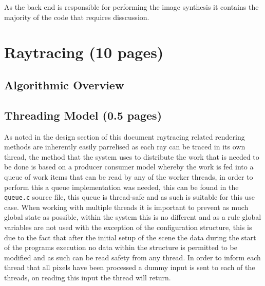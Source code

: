 As the back end is responsible for performing the image synthesis it contains the majority of the code that requires disscussion.



\section{Raytracing (10 pages)}
%
%
%
%

\subsection{Algorithmic Overview}

\subsection{Threading Model (0.5 pages)}
As noted in the design section of this document raytracing related rendering methods are inherently easily parrelised as each
ray can be traced in its own thread, the method that the system uses to distribute the work that is needed to be done is
based on a producer consumer model whereby the work is fed into a queue of work items that can be read by any of the worker
threads, in order to perform this a queue implementation was needed, this can be found in the \texttt{queue.c} source file,
this queue is thread-safe and as such is suitable for this use case. When working with multiple threads it is important
to prevent as much global state as possible, within the system this is no different and as a rule global variables are not used
with the exception of the configuration structure, this is due to the fact that after the initial setup of the scene the data
during the start of the programs execution no data within the structure is permitted to be modified and as such can be read
safety from any thread. In order to inform each thread that all pixels have been processed a dummy input is sent to each of the
threads, on reading this input the thread will return.


